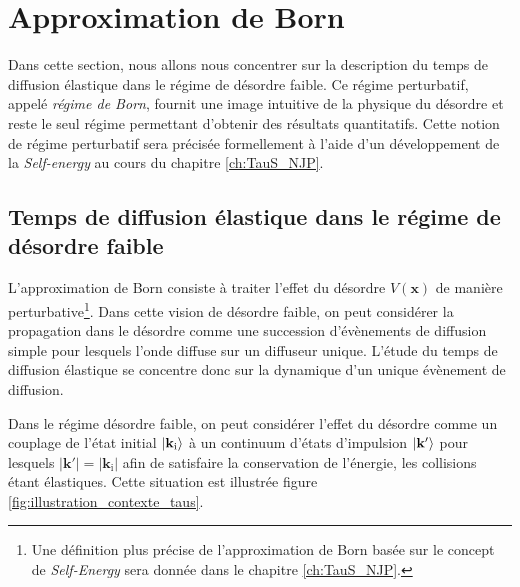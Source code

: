 \section{Approximation de Born}
Dans cette section, nous allons nous concentrer sur la description du temps de diffusion élastique dans le régime de désordre faible. Ce régime perturbatif, appelé \emph{régime de Born}, fournit une image intuitive de la physique du désordre et reste le seul régime permettant d'obtenir des résultats quantitatifs. Cette notion de régime perturbatif sera précisée formellement à l'aide d'un développement de la \emph{Self-energy} au cours du chapitre \ref{ch:TauS_NJP}.

\subsection{Temps de diffusion élastique dans le régime de désordre faible}
L'approximation de Born consiste à traiter l'effet du désordre $V(\mathbf{x})$ de manière perturbative\footnote{Une définition plus précise de l'approximation de Born basée sur le concept de \emph{Self-Energy} sera donnée dans le chapitre \ref{ch:TauS_NJP}.}.  Dans cette vision de désordre faible, on peut considérer la propagation dans le désordre comme une succession d'évènements de diffusion simple pour lesquels l'onde diffuse sur un diffuseur unique. L'étude du temps de diffusion élastique se concentre donc sur la dynamique d'un unique évènement de diffusion.



Dans le régime désordre faible, on peut considérer l'effet du désordre comme un couplage de l'état initial $\left| \mathbf{k}_{\mathrm{i}} \right\rangle$ à un continuum d'états d'impulsion $\left| \mathbf{k}' \right\rangle$ pour lesquels $\left| \mathbf{k}' \right| = \left| \mathbf{k}_{\mathrm{i}} \right| $ afin de satisfaire la conservation de l'énergie, les collisions étant élastiques. Cette situation est illustrée figure \ref{fig:illustration_contexte_taus}. 

